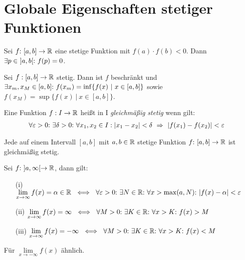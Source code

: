 \section{Globale Eigenschaften stetiger Funktionen}

\begin{framedthm}
	Sei $f{:}\ [a,b] \to \mathbb{R}$ eine stetige Funktion mit $f(a)\cdot f(b) < 0$. Dann $\exists p \in\  ]a,b[{:}\  f(p)=0$.
\end{framedthm}


\begin{framedthm}
	Sei $f:[a,b] \to \mathbb{R}$ stetig. Dann ist $f$ beschränkt und\\
	$\exists x_m, x_M \in [a,b]{:}\  f(x_m) = \inf\{f(x)\ |\ x \in [a,b]\}$ sowie $f(x_M) = \sup\{f(x)\ |\ x \in [a,b]\}$.
\end{framedthm}


\begin{frameddefn}
	Eine Funktion $f: I \to \mathbb{R}$ heißt in I \textit{gleichmäßig stetig} wenn gilt:
	\begin{align*}
		\forall \varepsilon > 0{:}\  \exists \delta > 0{:}\  \forall x_1, x_2 \in I: |x_1 - x_2| < \delta \ \Rightarrow\ |f(x_1) - f(x_2)| < \varepsilon
	\end{align*}
\end{frameddefn}


\begin{framedthm}
	Jede auf einem Intervall $[a,b]$ mit $a,b \in \mathbb{R}$ stetige Funktion $f{:}\  [a,b] \to \mathbb{R}$ ist gleichmäßig stetig.
\end{framedthm}


\begin{frameddefn}
	Sei $f{:}\ ]a,\infty[\to\mathbb{R}$, dann gilt:
	\begin{enumerate}
		\item[(i)] $\lim\limits_{x \to \infty} f(x) = \alpha \in \R \ \iff\ \forall \varepsilon>0\st \exists N \in \R\st \forall x > \max(a,N)\st |f(x)-\alpha| < \varepsilon$
		\item[(ii)] $\lim\limits_{x \to \infty} f(x) = \infty \ \iff\ \forall M>0\st \exists K \in \R\st \forall x > K\st f(x) > M$
		\item[(iii)] $\lim\limits_{x \to \infty} f(x) = -\infty \ \iff\ \forall M>0\st \exists K \in \R\st \forall x > K\st f(x) < M$
	\end{enumerate}
	Für $\lim\limits_{x \to -\infty} f(x)$ ähnlich.
\end{frameddefn}


